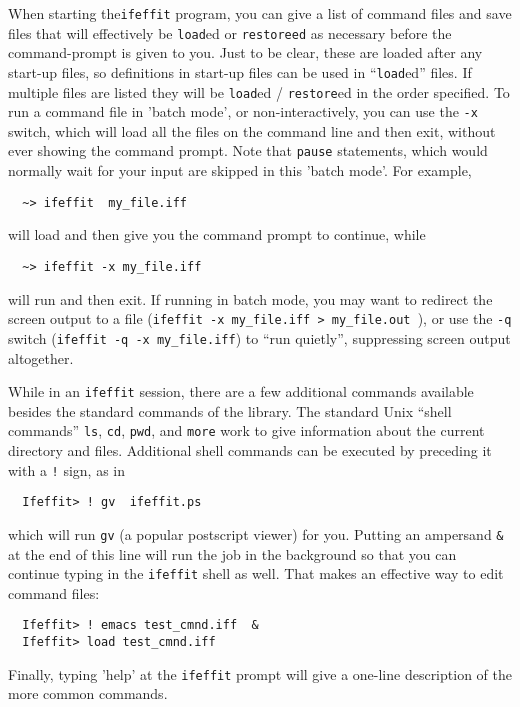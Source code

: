 \documentclass[11pt]{article}
\begin{document}
When starting the{\tt{ifeffit}} program, you can give a list of {\ifeffit}
command files and save files that will effectively be {\tt{load}}ed or
{\tt{restore}ed} as necessary before the command-prompt is given to you.
Just to be clear, these are loaded after any start-up files, so definitions
in start-up files can be used in ``{\tt{load}}ed'' files.  If multiple
files are listed they will be {\tt{load}}ed / {\tt{restore}}ed in the order
specified.  To run a command file in 'batch mode', or non-interactively,
you can use the {\tt{-x}} switch, which will load all the files on the
command line and then exit, without ever showing the command prompt.  Note
that {\tt{pause}} statements, which would normally wait for your input are
skipped in this 'batch mode'.  For example,
{\small\begin{verbatim}
  ~> ifeffit  my_file.iff
\end{verbatim}}\noindent
will load {} and then give you the command prompt to
continue, while
{\small\begin{verbatim}
  ~> ifeffit -x my_file.iff
\end{verbatim}
}\noindent
will run {} and then exit.  If running in batch mode,
you may want to redirect the screen output to a file ({\tt{ifeffit -x
    my\_file.iff > my\_file.out }}), or use the {\tt{-q}} switch
({\tt{ifeffit -q -x my\_file.iff}}) to ``run quietly'', suppressing screen
output altogether.

While in an {\tt{ifeffit}} session, there are a few additional commands
available besides the standard commands of the {\ifeffit} library.  The
standard Unix ``shell commands'' {\tt{ls}}, {\tt{cd}}, {\tt{pwd}}, and
{\tt{more}} work to give information about the current directory and files.
Additional shell commands can be executed by preceding it with a {\tt{!}}
sign, as in
{\small\begin{verbatim}
  Ifeffit> ! gv  ifeffit.ps
\end{verbatim}
}\noindent
which will run {\tt{gv}} (a popular postscript viewer) for you.  Putting an
ampersand {\tt{\&}} at the end of this line will run the job in the
background so that you can continue typing in the {\tt{ifeffit}} shell as
well.  That makes an effective way to edit command files:
{\small\begin{verbatim}
  Ifeffit> ! emacs test_cmnd.iff  &
  Ifeffit> load test_cmnd.iff
\end{verbatim}
}\noindent
Finally, typing 'help' at the {\tt{ifeffit}} prompt will give a
one-line description of the more common {\ifeffit} commands.
\end{document}
